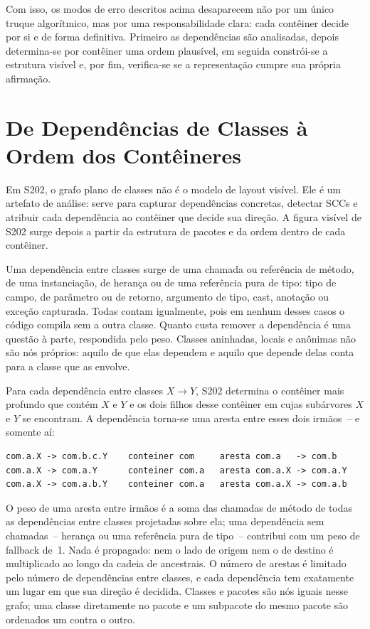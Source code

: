 \documentclass[a4paper,11pt]{article}
\begin{document}
Com isso, os modos de erro descritos acima desaparecem n\~ao por um \'unico
truque algor\'itmico, mas por uma responsabilidade clara: cada cont\^einer
decide por si e de forma definitiva. Primeiro as depend\^encias s\~ao
analisadas, depois determina-se por cont\^einer uma ordem plaus\'ivel, em
seguida constr\'oi-se a estrutura vis\'ivel e, por fim, verifica-se se a
representa\c{c}\~ao cumpre sua pr\'opria afirma\c{c}\~ao.

\section{De Depend\^encias de Classes \`a Ordem dos Cont\^eineres}

Em S202, o grafo plano de classes n\~ao \'e o modelo de layout vis\'ivel. Ele
\'e um artefato de an\'alise: serve para capturar depend\^encias concretas,
detectar SCCs e atribuir cada depend\^encia ao cont\^einer que decide sua
dire\c{c}\~ao. A figura vis\'ivel de S202 surge depois a partir da estrutura
de pacotes e da ordem dentro de cada cont\^einer.

Uma depend\^encia entre classes surge de uma chamada ou refer\^encia de m\'etodo,
de uma instancia\c{c}\~ao, de heran\c{c}a ou de uma refer\^encia pura de tipo:
tipo de campo, de par\^ametro ou de retorno, argumento de tipo, cast,
anota\c{c}\~ao ou exce\c{c}\~ao capturada. Todas contam igualmente, pois em
nenhum desses casos o c\'odigo compila sem a outra classe. Quanto custa remover a
depend\^encia \'e uma quest\~ao \`a parte, respondida pelo peso. Classes
aninhadas, locais e an\^onimas n\~ao s\~ao n\'os pr\'oprios: aquilo de que elas
dependem e aquilo que depende delas conta para a classe que as envolve.

Para cada depend\^encia entre classes $X \to Y$, S202 determina o cont\^einer
mais profundo que cont\'em $X$ e $Y$ e os dois filhos desse cont\^einer em
cujas sub\'arvores $X$ e $Y$ se encontram. A depend\^encia torna-se uma aresta
entre esses dois irm\~aos~-- e somente a\'i:

\begin{lstlisting}
com.a.X -> com.b.c.Y    conteiner com     aresta com.a   -> com.b
com.a.X -> com.a.Y      conteiner com.a   aresta com.a.X -> com.a.Y
com.a.X -> com.a.b.Y    conteiner com.a   aresta com.a.X -> com.a.b
\end{lstlisting}

O peso de uma aresta entre irm\~aos \'e a soma das chamadas de m\'etodo de
todas as depend\^encias entre classes projetadas sobre ela; uma depend\^encia
sem chamadas~-- heran\c{c}a ou uma refer\^encia pura de tipo~-- contribui com um
peso de fallback de~1. Nada \'e
propagado: nem o lado de origem nem o de destino \'e multiplicado ao longo da
cadeia de ancestrais. O n\'umero de arestas \'e limitado pelo n\'umero de
depend\^encias entre classes, e cada depend\^encia tem exatamente um lugar em
que sua dire\c{c}\~ao \'e decidida. Classes e pacotes s\~ao n\'os iguais nesse
grafo; uma classe diretamente no pacote e um subpacote do mesmo pacote s\~ao
ordenados um contra o outro.
\end{document}
